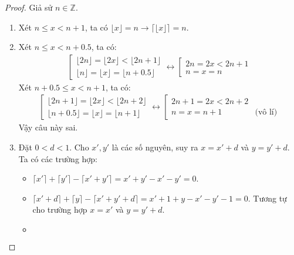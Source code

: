 \begin{proof}
    Giả sử $n\in\mathbb{Z}$.
    \begin{enumerate}[label=\alph*)]
        \item Xét $n\leq x<n+1$, ta có $\lfloor x\rfloor=n\rightarrow \lceil\lfloor x\rfloor\rceil=n$.
        \item Xét $n\leq x<n+0.5$, ta có:
        \begin{align*}
            \left[
            \begin{array}{l}
                \lfloor2n\rfloor=\lfloor2x\rfloor<\lfloor2n+1\rfloor\\
                \lfloor n\rfloor=\lfloor x\rfloor=\lfloor n+0.5\rfloor
            \end{array}
            \right .
            \leftrightarrow
            \left[
            \begin{array}{l}
                2n=2x<2n+1\\
                n=x=n
            \end{array}
            \right .
        \end{align*}
        Xét $n+0.5\leq x<n+1$, ta có:
        \begin{align*}
            \left[
            \begin{array}{l}
                \lfloor2n+1\rfloor=\lfloor2x\rfloor<\lfloor2n+2\rfloor\\
                \lfloor n+0.5\rfloor=\lfloor x\rfloor=\lfloor n+1\rfloor
            \end{array}
            \right .
            \leftrightarrow
            \left[
            \begin{array}{ll}
                2n+1=2x<2n+2&\\
                n=x=n+1 & \text{(vô lí)}
            \end{array}
            \right .
        \end{align*}
        Vậy câu này sai.
        \item Đặt $0<d<1$. Cho $x',y'$ là các số nguyên, suy ra $x=x'+d$ và $y=y'+d$. Ta có các trường hợp: \begin{itemize}
            \item $\lceil x'\rceil+\lceil y'\rceil-\lceil x'+y'\rceil=x'+y'-x'-y'=0$.
            \item $\lceil x'+d\rceil+\lceil y\rceil-\lceil x'+y'+d\rceil=x'+1+y-x'-y'-1=0$. Tương tự cho trường hợp $x=x'$ và $y=y'+d$.
            \item \begin{align*}

\end{align*}
\end{itemize}
\end{enumerate}
\end{proof}
